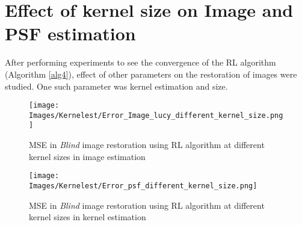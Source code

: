 \documentclass[a4paper]{book}
\begin{document}
%


\section[\Large Effect of kernel]{\Large Effect of kernel size on Image and PSF estimation}After performing experiments to see the convergence of the RL algorithm (Algorithm \ref{alg4}), effect of other parameters on the restoration of images were studied. One such parameter was kernel estimation and size. 

\begin{figure}[H]
	\centering
	\texttt{[image: Images/Kernelest/Error\_Image\_lucy\_different\_kernel\_size.png]}
	\caption[MSE in image estimation for kernel sizes]{MSE in \textit{Blind} image restoration using RL algorithm at different kernel sizes in image estimation}
	\label{BIDkernel}
\end{figure}

\begin{figure}[H]
	\centering
	\texttt{[image: Images/Kernelest/Error\_psf\_different\_kernel\_size.png]}
	\caption[MSE in kernel estimation for kernel sizes]{MSE in \textit{Blind} image restoration using RL algorithm at different kernel sizes in kernel estimation}
	\label{KernelEstkernel}
\end{figure}
\newpage
\end{document}
